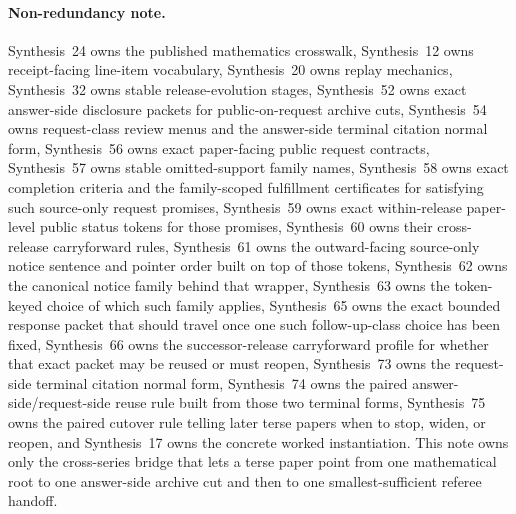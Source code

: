 \documentclass[11pt]{article}
\begin{document}
\paragraph{Non-redundancy note.}
Synthesis~24 owns the published mathematics crosswalk, Synthesis~12 owns receipt-facing line-item vocabulary, Synthesis~20 owns replay mechanics, Synthesis~32 owns stable release-evolution stages, Synthesis~52 owns exact answer-side disclosure packets for public-on-request archive cuts, Synthesis~54 owns request-class review menus and the answer-side terminal citation normal form, Synthesis~56 owns exact paper-facing public request contracts, Synthesis~57 owns stable omitted-support family names, Synthesis~58 owns exact completion criteria and the family-scoped fulfillment certificates for satisfying such source-only request promises, Synthesis~59 owns exact within-release paper-level public status tokens for those promises, Synthesis~60 owns their cross-release carryforward rules, Synthesis~61 owns the outward-facing source-only notice sentence and pointer order built on top of those tokens, Synthesis~62 owns the canonical notice family behind that wrapper, Synthesis~63 owns the token-keyed choice of which such family applies, Synthesis~65 owns the exact bounded response packet that should travel once one such follow-up-class choice has been fixed, Synthesis~66 owns the successor-release carryforward profile for whether that exact packet may be reused or must reopen, Synthesis~73 owns the request-side terminal citation normal form, Synthesis~74 owns the paired answer-side/request-side reuse rule built from those two terminal forms, Synthesis~75 owns the paired cutover rule telling later terse papers when to stop, widen, or reopen, and Synthesis~17 owns the concrete worked instantiation.\cite{series:mathcrosswalk,series:receiptitems,series:auditorreplay,series:releasespine,series:answerdisclosurepackets,series:challengeanswerreviewmenus,series:publicrequestcontracts,series:requestableevidenceclasses,series:requestfulfillmentcertificates,series:publicrequeststatusenvelopes,series:publicrequestcarryforward,series:publicrequestnotices,series:publicrequestnoticenormalforms,series:publicrequestnoticeselections,series:publicrequestresponsepackets,series:publicrequestresponsepacketcarryforward,series:publicrequestresponsepacketrefreshresponsepacketclosureverdicts,series:pairedterminalcitationdiscipline,series:pairedterminalcutoverrules,series:workedexample}
This note owns only the cross-series bridge that lets a terse paper point from one mathematical root to one answer-side archive cut and then to one smallest-sufficient referee handoff.
\end{document}

